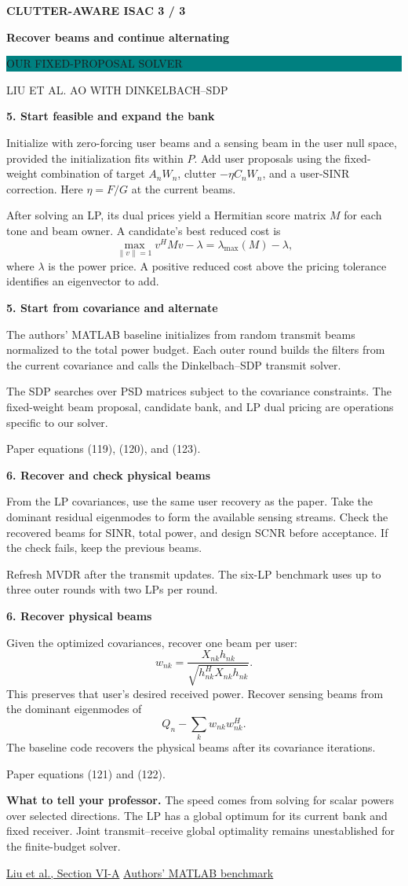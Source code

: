 \documentclass[11pt]{article}
\newcommand{\pair}[2]{%
\noindent\begin{minipage}[t]{.475\linewidth}\vspace{0pt}#1\end{minipage}\hfill
\begin{minipage}[t]{.475\linewidth}\vspace{0pt}#2\end{minipage}\par}
\newcommand{\head}[2]{%
{\sffamily\small\bfseries\color{teal} CLUTTER-AWARE ISAC \hfill #1 / 3}\par
{\sffamily\LARGE\bfseries\color{ink} #2}\par\vspace{3pt}
\pair{\colorbox{teal}{\parbox{.95\linewidth}{\color{white}\sffamily\bfseries\strut OUR FIXED-PROPOSAL SOLVER}}}
{\colorbox{paper}{\parbox{.95\linewidth}{\color{white}\sffamily\bfseries\strut LIU ET AL.\hspace{.85em} AO WITH DINKELBACH--SDP}}}\vspace{4pt}}
\newcommand{\sect}[1]{\par{\sffamily\large\bfseries\color{ink} #1}\par\vspace{-3pt}}
\newcommand{\rowline}{\par\vspace{3pt}{\color{line}\hrule}\vspace{5pt}}
\newcommand{\note}[1]{\par\vspace{7pt}\noindent\colorbox{wash}{\parbox{.98\linewidth}{\strut #1\strut}}\par}
\begin{document}
\newpage
\head{3}{Recover beams and continue alternating}
\pair{
\sect{5. Start feasible and expand the bank}
Initialize with zero-forcing user beams and a sensing beam in the user null space, provided the initialization fits within $P$. Add user proposals using the fixed-weight combination of target $A_nW_n$, clutter $-\eta C_nW_n$, and a user-SINR correction. Here $\eta=F/G$ at the current beams.

After solving an LP, its dual prices yield a Hermitian score matrix $M$ for each tone and beam owner. A candidate's best reduced cost is
\[
\max_{\|v\|=1}v^HMv-\lambda=\lambda_{\max}(M)-\lambda,
\]
where $\lambda$ is the power price. A positive reduced cost above the pricing tolerance identifies an eigenvector to add.
}{
\sect{5. Start from covariance and alternate}
The authors' MATLAB baseline initializes from random transmit beams normalized to the total power budget. Each outer round builds the filters from the current covariance and calls the Dinkelbach--SDP transmit solver.

The SDP searches over PSD matrices subject to the covariance constraints. The fixed-weight beam proposal, candidate bank, and LP dual pricing are operations specific to our solver.

{\small\color{paper}Paper equations (119), (120), and (123).}
}
\rowline
\pair{
\sect{6. Recover and check physical beams}
From the LP covariances, use the same user recovery as the paper. Take the dominant residual eigenmodes to form the available sensing streams. Check the recovered beams for SINR, total power, and design SCNR before acceptance. If the check fails, keep the previous beams.

Refresh MVDR after the transmit updates. The six-LP benchmark uses up to three outer rounds with two LPs per round.
}{
\sect{6. Recover physical beams}
Given the optimized covariances, recover one beam per user:
\[
w_{nk}=\frac{X_{nk}h_{nk}}{\sqrt{h_{nk}^HX_{nk}h_{nk}}}.
\]
This preserves that user's desired received power. Recover sensing beams from the dominant eigenmodes of
\[
Q_n-\sum_k w_{nk}w_{nk}^H .
\]
The baseline code recovers the physical beams after its covariance iterations.

{\small\color{paper}Paper equations (121) and (122).}
}
\note{\textbf{What to tell your professor.} The speed comes from solving for scalar powers over selected directions. The LP has a global optimum for its current bank and fixed receiver. Joint transmit--receive global optimality remains unestablished for the finite-budget solver.}
{\small\href{https://arxiv.org/abs/2602.10537}{Liu et al., Section VI-A} \hspace{.85em}
\href{https://github.com/RangLiu0706/Clutter-Aware-ISAC-Tutorial}{Authors' MATLAB benchmark}}
\end{document}
